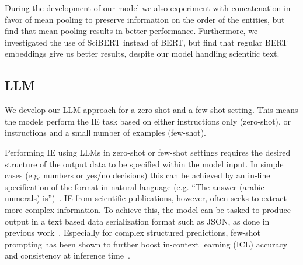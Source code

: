 
During the development of our model we also experiment with concatenation in favor of mean pooling to preserve information on the order of the entities, but find that mean pooling results in better performance. Furthermore, we investigated the use of SciBERT instead of BERT, but find that regular BERT embeddings give us better results, despite our model handling scientific text.


\subsection{LLM}\label{sec:methLLMs}

We develop our LLM approach for a zero-shot and a few-shot setting. This means the models perform the IE task based on either instructions only (zero-shot), or instructions and a small number of examples (few-shot).





Performing IE using LLMs in zero-shot or few-shot settings requires the desired structure of the output data to be specified within the model input. In simple cases (e.g. numbers or yes/no decisions) this can be achieved by an in-line specification of the format in natural language (e.g. ``The answer (arabic numerals) is'')~\cite{Kojima2022}. IE from scientific publications, however, often seeks to extract more complex information. To achieve this, the model can be tasked to produce output in a text based data serialization format such as JSON, as done in previous work~\cite{Dunn2022}. Especially for complex structured predictions, few-shot prompting has been shown to further boost in-context learning (ICL) accuracy and consistency at inference time~\cite{Brown2020}.

